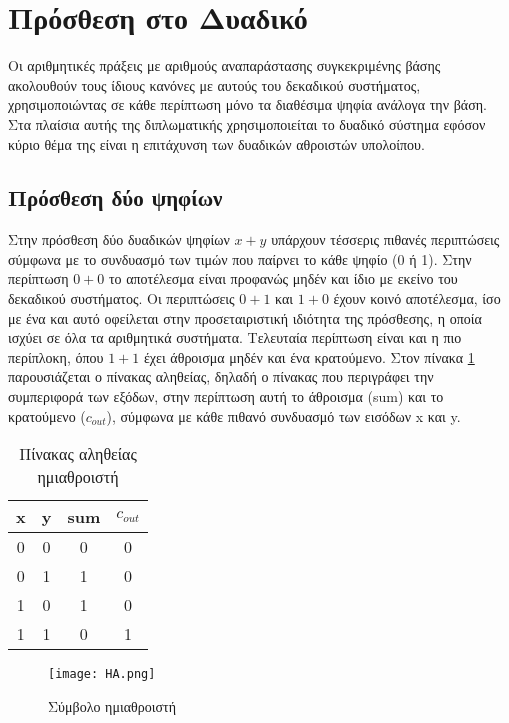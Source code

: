 

\section{Πρόσθεση στο Δυαδικό}
Οι αριθμητικές πράξεις με αριθμούς αναπαράστασης συγκεκριμένης βάσης ακολουθούν τους ίδιους κανόνες
με αυτούς του δεκαδικού συστήματος, χρησιμοποιώντας σε κάθε περίπτωση μόνο τα διαθέσιμα ψηφία ανάλογα την βάση. Στα πλαίσια αυτής της διπλωματικής χρησιμοποιείται το δυαδικό σύστημα εφόσον κύριο θέμα 
της είναι η επιτάχυνση των δυαδικών αθροιστών υπολοίπου.





\subsection{Πρόσθεση δύο ψηφίων}
Στην πρόσθεση δύο δυαδικών ψηφίων $x+y$ υπάρχουν τέσσερις πιθανές περιπτώσεις σύμφωνα με το συνδυασμό
των τιμών που παίρνει το κάθε ψηφίο (0 ή 1). Στην περίπτωση $0+0$ το αποτέλεσμα είναι προφανώς μηδέν 
και ίδιο με εκείνο του δεκαδικού συστήματος. Οι περιπτώσεις $0+1$ και $1+0$ έχουν κοινό αποτέλεσμα, 
ίσο με ένα και αυτό οφείλεται στην προσεταιριστική ιδιότητα της πρόσθεσης, η οποία ισχύει σε όλα
τα αριθμητικά συστήματα. Τελευταία περίπτωση είναι και η πιο περίπλοκη, όπου $1+1$ έχει άθροισμα μηδέν
και ένα κρατούμενο. Στον πίνακα \ref{tb:HA_truth_table} παρουσιάζεται ο πίνακας αληθείας, δηλαδή ο 
πίνακας που περιγράφει την συμπεριφορά των εξόδων, στην περίπτωση αυτή το άθροισμα (sum) και το 
κρατούμενο ($c_{out}$), σύμφωνα με κάθε πιθανό συνδυασμό των εισόδων x και y.


\begin{multicols}{2}
\hfill
\begin{table}[H]
\centering
 \begin{tabular}{||c c | c c||} 
 \hline
 x & y & sum & $c_{out}$ \\ [0.5ex] 
 \hline\hline
 0 & 0 & 0 & 0 \\ 
 \hline
 0 & 1 & 1 & 0 \\
 \hline
 1 & 0 & 1 & 0 \\
 \hline
 1 & 1 & 0 & 1 \\
 \hline
\end{tabular}
\caption{Πίνακας αληθείας ημιαθροιστή}
 \label{tb:HA_truth_table}
\end{table}


\begin{figure}[H]
\centering
\texttt{[image: HA.png]}
\caption{Σύμβολο ημιαθροιστή}
\label{HASchematic}
\end{figure}

\end{multicols}

